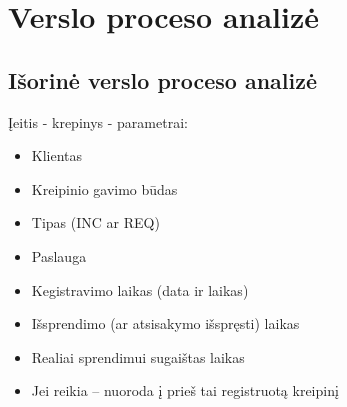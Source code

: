 \section{Verslo proceso analizė}

\subsection{Išorinė verslo proceso analizė}

Įeitis - krepinys - parametrai:
\begin{itemize}
\item Klientas
\item Kreipinio gavimo būdas
\item Tipas (INC ar REQ)
\item Paslauga
\item Kegistravimo laikas (data ir laikas)
\item Išsprendimo (ar atsisakymo išspręsti) laikas
\item Realiai sprendimui sugaištas laikas
\item Jei reikia – nuoroda į prieš tai registruotą kreipinį
\end{itemize}

